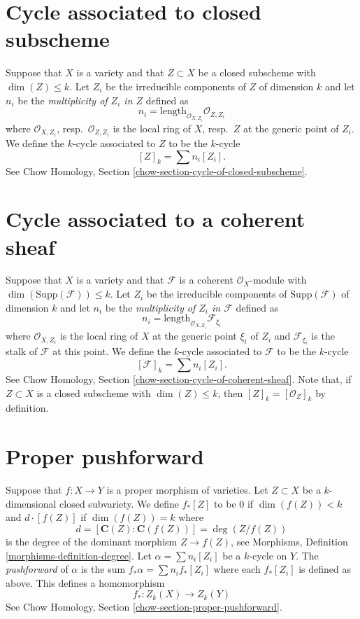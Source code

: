 \section{Cycle associated to closed subscheme}
\label{section-cycle-of-closed}

\noindent
Suppose that $X$ is a variety and that $Z \subset X$ be a closed subscheme
with $\dim(Z) \leq k$. Let $Z_i$ be the irreducible components of $Z$ of
dimension $k$ and let $n_i$ be the {\it multiplicity of $Z_i$ in $Z$}
defined as
$$
n_i = \text{length}_{\mathcal{O}_{X, Z_i}} \mathcal{O}_{Z, Z_i}
$$
where $\mathcal{O}_{X, Z_i}$, resp.\ $\mathcal{O}_{Z, Z_i}$ is the
local ring of $X$, resp.\ $Z$ at the generic point of $Z_i$.
We define the $k$-cycle associated to $Z$ to be the $k$-cycle
$$
[Z]_k = \sum n_i [Z_i].
$$
See Chow Homology, Section \ref{chow-section-cycle-of-closed-subscheme}.


\section{Cycle associated to a coherent sheaf}
\label{section-cycle-of-coherent-sheaf}

\noindent
Suppose that $X$ is a variety and that
$\mathcal{F}$ is a coherent $\mathcal{O}_X$-module with
$\dim(\text{Supp}(\mathcal{F})) \leq k$.
Let $Z_i$ be the irreducible components of $\text{Supp}(\mathcal{F})$
of dimension $k$ and let $n_i$ be the
{\it multiplicity of $Z_i$ in $\mathcal{F}$} defined as
$$
n_i = \text{length}_{\mathcal{O}_{X, Z_i}} \mathcal{F}_{\xi_i}
$$
where $\mathcal{O}_{X, Z_i}$ is the
local ring of $X$ at the generic point $\xi_i$ of $Z_i$
and $\mathcal{F}_{\xi_i}$ is the stalk of $\mathcal{F}$ at this point.
We define the $k$-cycle associated to $\mathcal{F}$ to be the $k$-cycle
$$
[\mathcal{F}]_k = \sum n_i [Z_i].
$$
See Chow Homology, Section \ref{chow-section-cycle-of-coherent-sheaf}.
Note that, if $Z \subset X$ is a closed subscheme with $\dim(Z) \leq k$, then
$[Z]_k = [\mathcal{O}_Z]_k$ by definition.


\section{Proper pushforward}
\label{section-pushforward}

\noindent
Suppose that $f : X \to Y$ is a proper morphism of varieties.
Let $Z \subset X$ be a $k$-dimensional
closed subvariety. We define $f_*[Z]$ to be $0$ if $\dim(f(Z))<k$
and $d \cdot [f(Z)]$ if $\dim(f(Z)) = k$ where
$$
d = [\mathbf{C}(Z) : \mathbf{C}(f(Z))] = \deg(Z/f(Z))
$$
is the degree of the dominant morphism $Z \to f(Z)$, see
Morphisms, Definition \ref{morphisms-definition-degree}.
Let $\alpha = \sum n_i [Z_i]$ be a $k$-cycle on $Y$. The
{\it pushforward} of $\alpha$ is the sum $f_* \alpha = \sum n_i f_*[Z_i]$
where each $f_*[Z_i]$ is defined as above. This defines a homomorphism
$$
f_* : Z_k(X) \longrightarrow Z_k(Y)
$$
See Chow Homology, Section \ref{chow-section-proper-pushforward}.

